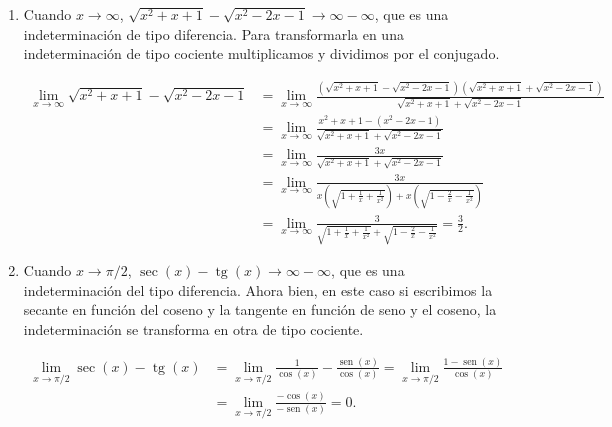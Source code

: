 \documentclass[
  spanish,
  a4paper,
]{scrreport}
\theoremstyle{definition}
\theoremstyle{remark}
\begin{document}
\begin{tcolorbox}
\begin{enumerate}
  Como \(\lim_{x\to 0^-}\frac{-1}{x} = \infty\) se tiene que

  \[
  \lim_{x\to 0^-}\frac{6}{4+e^{-1/x}} = \frac{6}{4+e^\infty} = 0.
  \]

  Y como \(\lim_{x\to 0^+}\frac{-1}{x} = -\infty\) se tiene que

  \[
  \lim_{x\to 0^-}\frac{6}{4+e^{-1/x}} = \frac{6}{4+e^{-\infty}} = \frac{6}{4}.
  \]

  Como los límites laterales son distintos, no existe el límite global.
\item
  Cuando \(x\to \infty\),
  \(\sqrt{x^2+x+1}-\sqrt{x^2-2x-1} \to \infty-\infty\), que es una
  indeterminación de tipo diferencia. Para transformarla en una
  indeterminación de tipo cociente multiplicamos y dividimos por el
  conjugado.

  \begin{align*}
  \lim_{x\to \infty} \sqrt{x^2+x+1}-\sqrt{x^2-2x-1}
  &= \lim_{x \to \infty} \frac{(\sqrt{x^2+x+1} - \sqrt{x^2-2x-1})(\sqrt{x^2+x+1} + \sqrt{x^2-2x-1})}{\sqrt{x^2+x+1} + \sqrt{x^2-2x-1}} \\
  &= \lim_{x \to \infty} \frac{x^2+x+1 - (x^2-2x-1)}{\sqrt{x^2+x+1} + \sqrt{x^2-2x-1}} \\
  &= \lim_{x \to \infty} \frac{3x}{\sqrt{x^2+x+1} + \sqrt{x^2-2x-1}} \\
  &= \lim_{x \to \infty} \frac{3x}{x\left(\sqrt{1+\frac{1}{x}+\frac{1}{x^2}}\right) + x\left(\sqrt{1-\frac{2}{x}-\frac{1}{x^2}}\right)} \\
  &= \lim_{x \to \infty} \frac{3}{\sqrt{1+\frac{1}{x}+\frac{1}{x^2}} + \sqrt{1-\frac{2}{x}-\frac{1}{x^2}}} 
  = \frac{3}{2}.
  \end{align*}
\item
  Cuando \(x\to \pi/2\),
  \(\sec(x)-\operatorname{tg}(x) \to \infty-\infty\), que es una
  indeterminación del tipo diferencia. Ahora bien, en este caso si
  escribimos la secante en función del coseno y la tangente en función
  de seno y el coseno, la indeterminación se transforma en otra de tipo
  cociente.

  \begin{align*}
  \lim_{x\to \pi/2}\sec(x)-\operatorname{tg}(x)
  &= \lim_{x\to \pi/2}\frac{1}{\cos(x)}-\frac{\operatorname{sen}(x)}{\cos(x)}
  = \lim_{x\to \pi/2}\frac{1-\operatorname{sen}(x)}{\cos(x)} \\
  &= \lim_{x\to \pi/2}\frac{-\cos(x)}{-\operatorname{sen}(x)}
  = 0. \tag{L'Hôpital}
  \end{align*}
\end{enumerate}

\end{tcolorbox}
\end{document}
